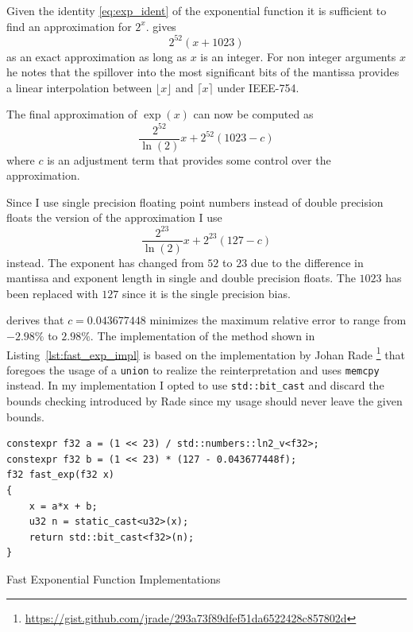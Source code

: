 \documentclass[a4paper, 11pt]{memoir}
\begin{document}
    Given the identity \eqref{eq:exp_ident} of the exponential function it is sufficient to find an approximation for $2^x$. \citeauthor{fast_exp} gives 
    \begin{equation}
        2^{52}(x + 1023)
    \end{equation}
    as an exact approximation as long as $x$ is an integer. For non integer arguments $x$ he notes that the spillover into the most significant bits of the mantissa
    provides a linear interpolation between $\lfloor x \rfloor$ and $\lceil x \rceil$ under IEEE-754.

    The final approximation of $\exp{(x)}$ can now be computed as
    \begin{equation}
        \frac{2^{52}}{\ln{(2)}} x + 2^{52}(1023 - c)
    \end{equation}
    where $c$ is an adjustment term that provides some control over the approximation.

    Since I use single precision floating point numbers instead of double precision floats the version of the approximation I use
    \begin{equation}
        \frac{2^{23}}{\ln{(2)}}x + 2^{23}(127 - c)
    \end{equation}
    instead. The exponent has changed from $52$ to $23$ due to the difference in mantissa and exponent length in single and double precision floats. The $1023$ has been replaced with $127$
    since it is the single precision bias.

    \citeauthor{fast_exp} derives that $c = 0.043677448$ minimizes the maximum relative error to range from $-2.98\%$ to $2.98\%$.
    The implementation of the method shown in Listing~\ref{lst:fast_exp_impl} is based on the implementation by Johan Rade
    \footnote{\href{https://gist.github.com/jrade/293a73f89dfef51da6522428c857802d}{https://gist.github.com/jrade/293a73f89dfef51da6522428c857802d}}
    that foregoes the usage of a \texttt{union} to realize the reinterpretation and uses \texttt{memcpy} instead.
    In my implementation I opted to use \texttt{std::bit_cast} and discard the bounds checking introduced by Rade since
    my usage should never leave the given bounds.

    \begin{listing}[H]
        \begin{verbatim}
constexpr f32 a = (1 << 23) / std::numbers::ln2_v<f32>;
constexpr f32 b = (1 << 23) * (127 - 0.043677448f);
f32 fast_exp(f32 x)
{
    x = a*x + b;
    u32 n = static_cast<u32>(x);
    return std::bit_cast<f32>(n);
}
        \end{verbatim}
        \caption{Fast Exponential Function Implementations}
        \label{lst:fast_exp_impl}
    \end{listing}
\end{document}
